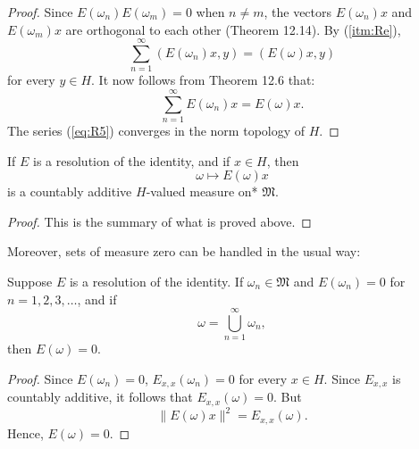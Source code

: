 \begin{proof}
  Since \( E(\omega_n)E(\omega_m) = 0 \) when \( n \neq m \), the vectors \( E(\omega_n)x \) and \( E(\omega_m)x \)
  are orthogonal to each other (Theorem 12.14).
  By (\ref{itm:Re}),
  \begin{equation}
    \label{eq:R5}
    \sum_{n=1}^{\infty} (E(\omega_n)x, y) = (E(\omega)x, y)
  \end{equation}
  for every \( y \in H \).
  It now follows from Theorem 12.6 that:
  \[
    \sum_{n=1}^{\infty} E(\omega_n)x = E(\omega)x.
  \]
  The series (\eqref{eq:R5}) converges in the norm topology of \( H \).
\end{proof}

\begin{proposition}[Rudin 12.18]
  \label{thm:resId_vectorMeasure}
  If \( E \) is a resolution of the identity, and if \( x \in H \), then
  \[
    \omega \mapsto E(\omega)x
  \]
  is a countably additive \( H \)-valued measure on* \( \mathfrak{M} \).
\end{proposition}

\begin{proof}
  This is the summary of what is proved above.
\end{proof}

Moreover, sets of measure zero can be handled in the usual way:

\begin{proposition}[Rudin 12.19]
  \label{thm:resId_of_zero}
  Suppose \( E \) is a resolution of the identity.
  If \( \omega_n \in \mathfrak{M} \) and \( E(\omega_n) = 0 \) for \( n = 1,2,3,\dots \), and if
  \[
    \omega = \bigcup_{n=1}^{\infty} \omega_n,
  \]
  then \( E(\omega) = 0 \).
\end{proposition}

\begin{proof}
  Since \( E(\omega_n) = 0 \), \( E_{x,x}(\omega_n) = 0 \) for every \( x \in H \).
  Since \( E_{x,x} \) is countably additive, it follows that \( E_{x,x}(\omega) = 0 \).
  But
  \[
    \|E(\omega)x\|^2 = E_{x,x}(\omega).
  \]
  Hence, \( E(\omega) = 0 \).
\end{proof}




